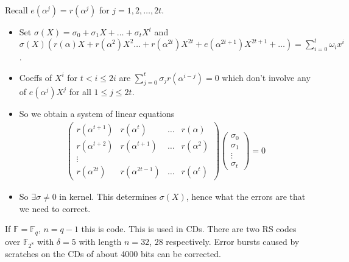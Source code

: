 Recall $e(\alpha^j) = r(\alpha^j)$ for $j = 1, 2, \dots, 2t$.
\begin{itemize}
    \item Set $\sigma(X) = \sigma_0 + \sigma_1 X + \dots + \sigma_t X^t$ and $\sigma(X)(r(\alpha) X + r(\alpha^2) X^2 \dots + r(\alpha^{2t})X^{2t} + e(\alpha^{2t + 1}) X^{2t + 1} + \dots) = \sum_{i=0}^{t} \omega_i x^i$.
    \item Coeffs of $X^i$ for $t < i \leq 2i$ are $\sum_{j=0}^t \sigma_j r(\alpha^{i-j}) = 0$ which don't involve any of $e(\alpha^j)X^j$ for all $1 \leq j \leq 2t$.
    \item So we obtain a system of linear equations
    \begin{align*}
        \begin{pmatrix}
        r(\alpha^{t+1}) & r(\alpha^t) & \dots & r(\alpha) \\
        r(\alpha^{t+2}) & r(\alpha^{t+1}) & \dots & r(\alpha^2) \\
        \vdots &  &  &  \\
        r(\alpha^{2t}) & r(\alpha^{2t-1}) & \dots & r(\alpha^{t})
        \end{pmatrix}
        \begin{pmatrix}\sigma_0 \\ \sigma_1 \\ \vdots\\ \sigma_t \end{pmatrix}
        = 0
    \end{align*}
    \item So $\exists \sigma \neq 0$ in kernel.
    This determines $\sigma(X)$, hence what the errors are that we need to correct.
\end{itemize}

\begin{example}
    If $\mathbb{F} = \mathbb{F}_q$, $n = q - 1$ this is  code.
    This is used in CDs.
    There are two RS codes over $\mathbb{F}_{2^8}$ with $\delta = 5$ with length $n = 32$, $28$ respectively.
    Error bursts caused by scratches on the CDs of about 4000 bits can be corrected.
\end{example}

